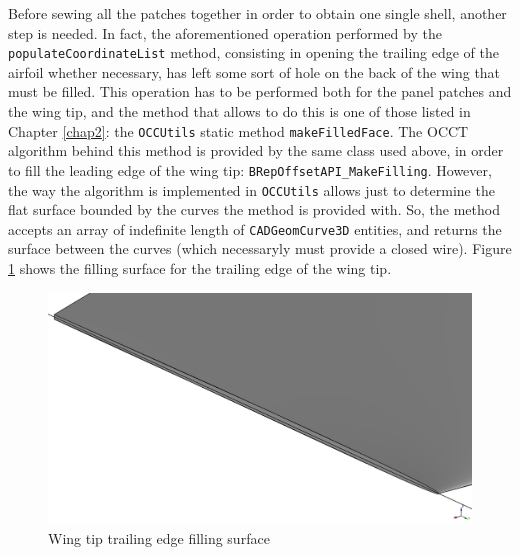 \bigskip
\noindent
Before sewing all the patches together in order to obtain one single shell, another step is needed. In fact, the aforementioned operation performed by the \lstinline[language=Java]!populateCoordinateList! method, consisting in opening the trailing edge of the airfoil whether necessary, has left some sort of hole on the back of the wing that must be filled. This operation has to be performed both for the panel patches and the wing tip, and the method that allows to do this is one of those listed in Chapter \ref{chap2}: the \lstinline[language=Java]!OCCUtils! static method \lstinline[language=Java]!makeFilledFace!. The \gls{OCCT} algorithm behind this method is provided by the same class used above, in order to fill the leading edge of the wing tip: \lstinline[language=Java]!BRepOffsetAPI_MakeFilling!. However, the way the algorithm is implemented in \lstinline[language=Java]!OCCUtils! allows just to determine the flat surface bounded by the curves the method is provided with. So, the method accepts an array of indefinite length of \lstinline[language=Java]!CADGeomCurve3D! entities, and returns the surface between the curves (which necessaryly must provide a closed wire). Figure \ref{fig:WingTipTE} shows the filling surface for the trailing edge of the wing tip.
% 
\begin{figure}[H]
\centering
\includegraphics[scale=0.30]{Immagini/Capitolo3/WingTipTEFilledFace}
\caption{Wing tip trailing edge filling surface}
\label{fig:WingTipTE}
\end{figure}
%  

